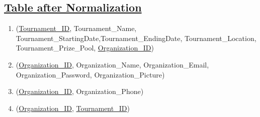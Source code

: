 \subsection*{\underline{Table after Normalization}}

\begin{enumerate}
    \item(\underline{Tournament\_ID}, Tournament\_Name, Tournament\_StartingDate,Tournament\_EndingDate, Tournament\_Location, Tournament\_Prize\_Pool, \underline{Organization\_ID})
    \item (\underline{Organization\_ID}, Organization\_Name, Organization\_Email, Organization\_Password, Organization\_Picture)
    \item (\underline{Organization\_ID}, Organization\_Phone)
    \item (\underline{Organization\_ID}, \underline{Tournament\_ID})
\end{enumerate}


\clearpage